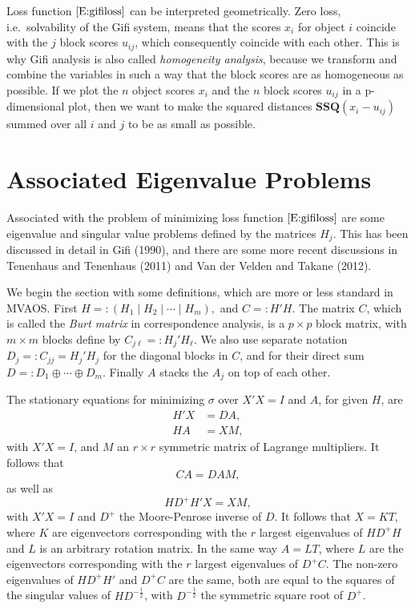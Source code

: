 \documentclass[
  12pt,
  letterpaper,
  DIV=11,
  numbers=noendperiod]{scrreprt}
\newcommand{\df}{=:}
\begin{document}
Loss function \(\eqref{E:gifiloss}\) can be interpreted geometrically.
Zero loss, i.e.~solvability of the Gifi system, means that the scores
\(x_i\) for object \(i\) coincide with the \(j\) block scores
\(u_{ij}\), which consequently coincide with each other. This is why
Gifi analysis is also called \emph{homogeneity analysis}, because we
transform and combine the variables in such a way that the block scores
are as homogeneous as possible. If we plot the \(n\) object scores
\(x_i\) and the \(n\) block scores \(u_{ij}\) in a p-dimensional plot,
then we want to make the squared distances \(\mathbf{SSQ}(x_i-u_{ij})\)
summed over all \(i\) and \(j\) to be as small as possible.

\section{Associated Eigenvalue
Problems}\label{associated-eigenvalue-problems}

Associated with the problem of minimizing loss function
\(\eqref{E:gifiloss}\) are some eigenvalue and singular value problems
defined by the matrices \(H_j\). This has been discussed in detail in
Gifi (1990), and there are some more recent discussions in Tenenhaus and
Tenenhaus (2011) and Van der Velden and Takane (2012).

We begin the section with some definitions, which are more or less
standard in MVAOS. First \(H\df(H_1\mid H_2\mid\cdots\mid H_m),\) and
\(C\df H'H\). The matrix \(C\), which is called the \emph{Burt matrix}
in correspondence analysis, is a \(p\times p\) block matrix, with
\(m\times m\) blocks define by \(C_{j\ell}\df H_j'H_\ell\). We also use
separate notation \(D_j\df C_{jj}=H_j'H_j\) for the diagonal blocks in
\(C\), and for their direct sum \(D\df D_1\oplus\cdots\oplus D_m\).
Finally \(A\) stacks the \(A_j\) on top of each other.

The stationary equations for minimizing \(\sigma\) over \(X'X=I\) and
\(A\), for given \(H\), are \begin{align}
H'X&=DA,\\
HA&=XM,
\end{align} with \(X'X=I\), and \(M\) an \(r\times r\) symmetric matrix
of Lagrange multipliers. It follows that \begin{equation}
CA=DAM,\label{E:stata}
\end{equation} as well as \begin{equation}
HD^+H'X=XM,\label{E:statx}
\end{equation} with \(X'X=I\) and \(D^+\) the Moore-Penrose inverse of
\(D\). It follows that \(X=KT\), where \(K\) are eigenvectors
corresponding with the \(r\) largest eigenvalues of \(HD^+H\) and \(L\)
is an arbitrary rotation matrix. In the same way \(A=LT\), where \(L\)
are the eigenvectors corresponding with the \(r\) largest eigenvalues of
\(D^+C\). The non-zero eigenvalues of \(HD^+H'\) and \(D^+C\) are the
same, both are equal to the squares of the singular values of
\(HD^{-\frac12}\), with \(D^{-\frac12}\) the symmetric square root of
\(D^+\).
\end{document}
